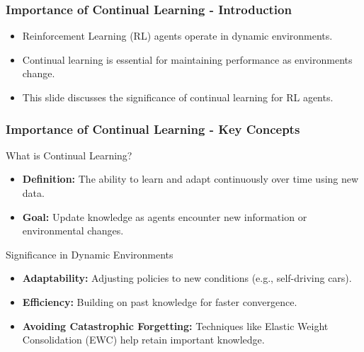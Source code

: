 \documentclass[aspectratio=169]{beamer}
\begin{document}
\begin{frame}[fragile]
    \frametitle{Importance of Continual Learning - Introduction}
    \begin{itemize}
        \item Reinforcement Learning (RL) agents operate in dynamic environments.
        \item Continual learning is essential for maintaining performance as environments change.
        \item This slide discusses the significance of continual learning for RL agents.
    \end{itemize}
\end{frame}

\begin{frame}[fragile]
    \frametitle{Importance of Continual Learning - Key Concepts}
    \begin{block}{What is Continual Learning?}
        \begin{itemize}
            \item \textbf{Definition:} The ability to learn and adapt continuously over time using new data.
            \item \textbf{Goal:} Update knowledge as agents encounter new information or environmental changes.
        \end{itemize}
    \end{block}

    \begin{block}{Significance in Dynamic Environments}
        \begin{itemize}
            \item \textbf{Adaptability:} Adjusting policies to new conditions (e.g., self-driving cars).
            \item \textbf{Efficiency:} Building on past knowledge for faster convergence.
            \item \textbf{Avoiding Catastrophic Forgetting:} Techniques like Elastic Weight Consolidation (EWC) help retain important knowledge.
        \end{itemize}
    \end{block}
\end{frame}
\end{document}
